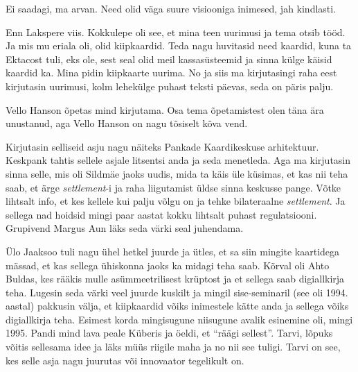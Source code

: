 Ei saadagi, ma arvan. Need olid väga suure visiooniga inimesed, jah kindlasti. 


Enn Lakspere viis. Kokkulepe oli see, et  mina teen uurimusi ja tema otsib tööd. Ja mis  mu eriala oli, olid kiipkaardid. Teda nagu huvitasid need kaardid, kuna ta Ektacost tuli, eks ole, sest  seal olid meil kassasüsteemid ja sinna külge käisid kaardid ka. Mina pidin  kiipkaarte uurima. No ja siis ma kirjutasingi raha eest kirjutasin uurimusi, kolm lehekülge puhast teksti päevas, seda on päris palju.

Vello Hanson õpetas mind kirjutama. Osa tema õpetamistest olen täna ära unustanud, aga Vello Hanson on nagu tõsiselt kõva vend. 

Kirjutasin selliseid asju nagu näiteks Pankade Kaardikeskuse arhitektuur. Keskpank tahtis sellele asjale litsentsi anda ja seda menetleda. Aga ma kirjutasin sinna  selle, mis oli Sildmäe jaoks uudis, mida ta käis üle küsimas, et kas nii teha saab, et ärge \emph{settlement}-i ja raha liigutamist üldse sinna keskusse pange. Võtke lihtsalt info, et kes kellele kui palju võlgu on ja tehke bilateraalne \emph{settlement}. Ja sellega nad hoidsid mingi paar aastat kokku lihtsalt puhast regulatsiooni. Grupivend Margus Aun läks seda värki seal juhendama. 

Ülo Jaaksoo tuli nagu ühel hetkel juurde ja ütles, et sa siin mingite kaartidega mässad, et  kas sellega ühiskonna jaoks ka midagi teha saab. Kõrval oli Ahto Buldas, kes rääkis mulle asümmeetrilisest krüptost ja et sellega saab digiallkirja teha. Lugesin seda värki veel juurde kuskilt ja mingil sise-seminaril (see oli 1994. aastal) pakkusin välja, et kiipkaardid võiks inimestele kätte anda ja sellega võiks digiallkirja teha. Esimest korda mingisugune niisugune avalik esinemine oli, mingi 1995. Pandi mind lava peale Küberis ja öeldi, et \enquote{räägi sellest}. Tarvi, lõpuks võitis sellesama idee ja läks müüs riigile maha ja no nii see tuligi. Tarvi on see, kes selle asja nagu juurutas või innovaator tegelikult on.

                 
